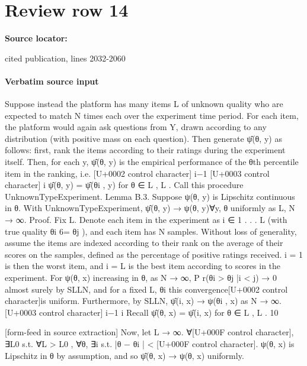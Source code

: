 \documentclass[10pt]{article}
\begin{document}
\section*{Review row 14}
\textbf{Source locator:} {\footnotesize\raggedright cited publication, lines 2032-\allowbreak{}2060\par}
\paragraph{Verbatim source input}
\begin{ReviewVerbatim}
Suppose instead the platform has many items L of unknown quality who are expected to match N
times each over the experiment time period. For each item, the platform would again ask questions
from Y, drawn according to any distribution (with positive mass on each question). Then generate
ψ̂(θ, y) as follows: first, rank the items according to their ratings during the experiment itself.
Then, for each y, ψ̂(θ, y) is
the empirical
performance of the θth percentile item in the ranking, i.e.
[U+0002 control character] i−1
[U+0003 control character]
i
ψ̂(θ, y) = ψ̂(θi , y) for θ ∈ L , L . Call this procedure UnknownTypeExperiment.
Lemma B.3. Suppose ψ(θ, y) is Lipschitz continuous in θ. With UnknownTypeExperiment, ψ̂(θ, y) →
ψ(θ, y)∀y, θ uniformly as L, N → ∞.
Proof. Fix L. Denote each item in the experiment as i ∈ {1 . . . L} (with true quality θi 6= θj ),
and each item has N samples. Without loss of generality, assume the items are indexed according
to their rank on the average of their scores on the samples, defined as the percentage of positive
ratings received. i = 1 is then the worst item, and i = L is the best item according to scores in the
experiment.
For ψ(θ, x) increasing in θ, as N → ∞, P r(θi > θj |i < j) → 0 almost surely by SLLN, and for
a fixed L, {θi } this convergence[U+0002 control character]is uniform.
Furthermore, by SLLN, ψ̂(i, x) → ψ(θi , x) as N → ∞.
[U+0003 control character]
i−1 i
Recall ψ̂(θ, x) = ψ̂(i, x) for θ ∈ L , L .
10


[form-feed in source extraction]
Now, let L → ∞. ∀[U+000F control character], ∃L0 s.t. ∀L > L0 , ∀θ, ∃i s.t. |θ − θi | < [U+000F control character]. ψ(θ, x) is Lipschitz in θ by
assumption, and so ψ̂(θ, x) → ψ(θ, x) uniformly.
\end{ReviewVerbatim}
\end{document}
